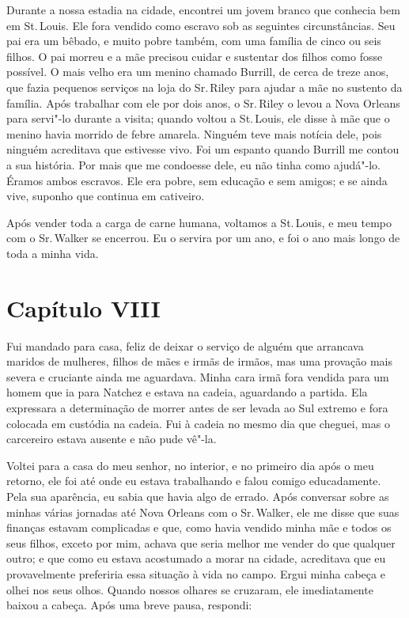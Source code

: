 Durante a nossa estadia na cidade, encontrei um jovem branco que
conhecia bem em St.\,Louis. Ele fora vendido como escravo sob as
seguintes circunstâncias. Seu pai era um bêbado, e muito pobre também,
com uma família de cinco ou seis filhos. O pai morreu e a mãe precisou
cuidar e sustentar dos filhos como fosse possível. O mais velho era um
menino chamado Burrill, de cerca de treze anos, que fazia pequenos
serviços na loja do Sr.\,Riley para ajudar a mãe no sustento da família.
Após trabalhar com ele por dois anos, o Sr.\,Riley o levou a Nova Orleans
para servi"-lo durante a visita; quando voltou a St.\,Louis, ele disse à
mãe que o menino havia morrido de febre amarela. Ninguém teve mais
notícia dele, pois ninguém acreditava que estivesse vivo. Foi um espanto
quando Burrill me contou a sua história. Por mais que me condoesse dele,
eu não tinha como ajudá"-lo. Éramos ambos escravos. Ele era pobre, sem
educação e sem amigos; e se ainda vive, suponho que continua em
cativeiro.

Após vender toda a carga de carne humana, voltamos a St.\,Louis, e meu
tempo com o Sr.\,Walker se encerrou. Eu o servira por um ano, e foi o ano
mais longo de toda a minha vida.

\chapter*{Capítulo VIII}

Fui mandado para casa, feliz de deixar o serviço de alguém que arrancava
maridos de mulheres, filhos de mães e irmãs de irmãos, mas uma provação
mais severa e cruciante ainda me aguardava. Minha cara irmã fora vendida
para um homem que ia para Natchez e estava na cadeia, aguardando a
partida. Ela expressara a determinação de morrer antes de ser levada ao
Sul extremo e fora colocada em custódia na cadeia. Fui à cadeia no mesmo
dia que cheguei, mas o carcereiro estava ausente e não pude vê"-la.

Voltei para a casa do meu senhor, no interior, e no primeiro dia após o
meu retorno, ele foi até onde eu estava trabalhando e falou comigo
educadamente. Pela sua aparência, eu sabia que havia algo de errado.
Após conversar sobre as minhas várias jornadas até Nova Orleans com o
Sr.\,Walker, ele me disse que suas finanças estavam complicadas e que,
como havia vendido minha mãe e todos os seus filhos, exceto por mim,
achava que seria melhor me vender do que qualquer outro; e que como eu
estava acostumado a morar na cidade, acreditava que eu provavelmente
preferiria essa situação à vida no campo. Ergui minha cabeça e olhei nos
seus olhos. Quando nossos olhares se cruzaram, ele imediatamente baixou
a cabeça. Após uma breve pausa, respondi:

